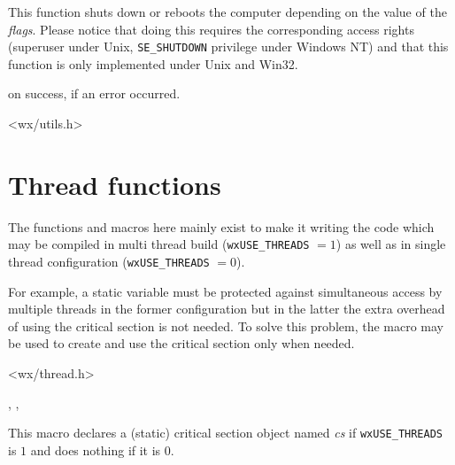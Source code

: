 
This function shuts down or reboots the computer depending on the value of the
{\it flags}. Please notice that doing this requires the corresponding access
rights (superuser under Unix, {\tt SE\_SHUTDOWN} privilege under Windows NT)
and that this function is only implemented under Unix and Win32.




\true on success, \false if an error occurred.


<wx/utils.h>



\section{Thread functions}\label{threadfunctions}

The functions and macros here mainly exist to make it writing the code which
may be compiled in multi thread build ({\tt wxUSE\_THREADS} $= 1$) as well as
in single thread configuration ({\tt wxUSE\_THREADS} $= 0$).

For example, a static variable must be protected against simultaneous access by
multiple threads in the former configuration but in the latter the extra
overhead of using the critical section is not needed. To solve this problem,
the  macro may be used
to create and use the critical section only when needed.


<wx/thread.h>


, , 



\label{wxcritsectdeclare}


This macro declares a (static) critical section object named {\it cs} if
{\tt wxUSE\_THREADS} is $1$ and does nothing if it is $0$.



